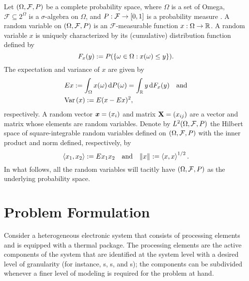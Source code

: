 Let $(\Omega, \mathcal{F}, \probability)$ be a complete probability space, where
$\Omega$ is a set of Omega, $\mathcal{F} \subseteq 2^\Omega$ is a
$\sigma$-algebra on $\Omega$, and $\probability: \mathcal{F} \to [0, 1]$ is a
probability measure \cite{durrett2010}. A random variable on $(\Omega,
\mathcal{F}, \probability)$ is an $\mathcal{F}$-measurable function $x: \Omega
\to \mathbb{R}$. A random variable $x$ is uniquely characterized by its (cumulative)
distribution function defined by
\begin{equation*}
  F_x(y) := \probability(\{ \omega \in \Omega: x(\omega) \leq y \}).
\end{equation*}
The expectation and variance of $x$ are given by
\begin{align*}
  & \expectation{x} := \int_\Omega x(\omega) \, \d \probability(\omega) = \int_\real y \, \d F_x(y) \hspace{1em} \text{and} \\
  & \variance{x} := \expectation{(x - \expectation{x})^2},
\end{align*}
respectively. A random vector $\boldsymbol{x} = (x_i)$ and matrix $\mathbf{X} = (x_{ij})$ are
a vector and matrix whose elements are random variables. Denote by
$\L{2}(\Omega, \mathcal{F}, \probability)$ the Hilbert space of
square-integrable random variables \cite{janson1997} defined on $(\Omega,
\mathcal{F}, \probability)$ with the inner product and norm defined,
respectively, by
\begin{equation*}
  \innerproduct{x_1}{x_2} := \expectation{x_1 x_2} \hspace{1em} \text{and} \hspace{1em}
  \norm{x} := \innerproduct{x}{x}^{1/2}.
\end{equation*}
In what follows, all the random variables will tacitly have $(\Omega,
\mathcal{F}, \probability)$ as the underlying probability space.

\section{Problem Formulation}

Consider a heterogeneous electronic system that consists of \np processing
elements and is equipped with a thermal package. The processing elements are the
active components of the system that are identified at the system level with a
desired level of granularity (for instance, s, s, and
s); the components can be subdivided whenever a finer level of modeling
is required for the problem at hand.

